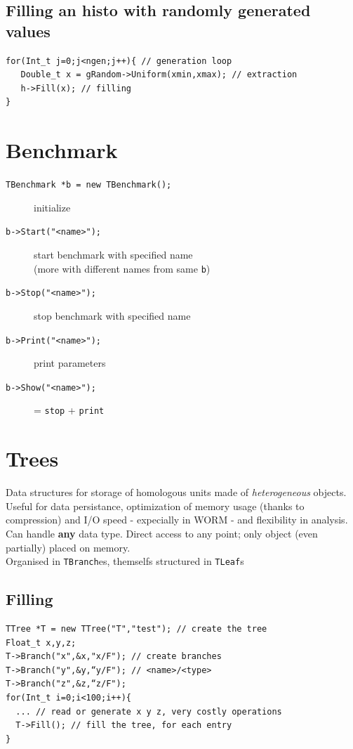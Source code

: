 \documentclass[10pt, twoside]{article}
\newcommand{\ttt}[1]{\colorbox{boxgray}{\texttt{#1}}}
\begin{document}
\subsection{Filling an histo with randomly generated values}
\begin{verbatim}
for(Int_t j=0;j<ngen;j++){ // generation loop
   Double_t x = gRandom->Uniform(xmin,xmax); // extraction
   h->Fill(x); // filling
}
\end{verbatim}

\section{Benchmark}

\begin{description}

\item[\ttt{TBenchmark *b = new TBenchmark();}] initialize

\item[\ttt{b->Start("<name>");}] start benchmark with specified name 
\\(more with different names from same \texttt{b})

\item[\ttt{b->Stop("<name>");}] stop benchmark with specified name

\item[\ttt{b->Print("<name>");}] print parameters

\item[\ttt{b->Show("<name>");}] = \texttt{stop} + \texttt{print}

\end{description}

\section{Trees}
Data structures for storage of homologous units made of \textit{heterogeneous} objects. Useful for data persistance, optimization of memory usage (thanks to compression) and I/O speed - expecially in WORM - and flexibility in analysis.
\\Can handle \textbf{any} data type. Direct access to any point; only object (even partially) placed on memory.
\\Organised in \texttt{TBranch}es, themselfs structured in \texttt{TLeaf}s

\subsection{Filling}
\begin{verbatim}
TTree *T = new TTree("T","test"); // create the tree 
Float_t x,y,z;
T->Branch("x",&x,"x/F"); // create branches 
T->Branch("y",&y,“y/F"); // <name>/<type>
T->Branch("z",&z,“z/F"); 
for(Int_t i=0;i<100;i++){
  ... // read or generate x y z, very costly operations
  T->Fill(); // fill the tree, for each entry
}
\end{verbatim}
\end{document}

